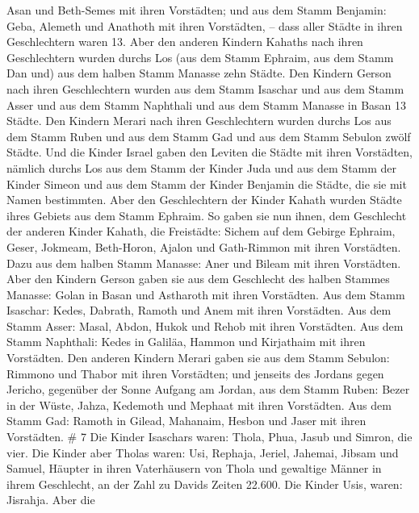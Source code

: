  Asan und Beth-Semes mit ihren Vorstädten; 
und aus dem Stamm Benjamin: Geba, Alemeth und Anathoth mit ihren
Vorstädten, -- dass aller Städte in ihren Geschlechtern waren 13.
 Aber den anderen Kindern Kahaths nach ihren Geschlechtern
wurden durchs Los (aus dem Stamm Ephraim, aus dem Stamm Dan und) aus dem
halben Stamm Manasse zehn Städte.  Den Kindern Gerson nach
ihren Geschlechtern wurden aus dem Stamm Isaschar und aus dem Stamm
Asser und aus dem Stamm Naphthali und aus dem Stamm Manasse in Basan 13
Städte.  Den Kindern Merari nach ihren Geschlechtern wurden
durchs Los aus dem Stamm Ruben und aus dem Stamm Gad und aus dem Stamm
Sebulon zwölf Städte.  Und die Kinder Israel gaben den
Leviten die Städte mit ihren Vorstädten,  nämlich durchs
Los aus dem Stamm der Kinder Juda und aus dem Stamm der Kinder Simeon
und aus dem Stamm der Kinder Benjamin die Städte, die sie mit Namen
bestimmten.  Aber den Geschlechtern der Kinder Kahath
wurden Städte ihres Gebiets aus dem Stamm Ephraim.  So
gaben sie nun ihnen, dem Geschlecht der anderen Kinder Kahath, die
Freistädte: Sichem auf dem Gebirge Ephraim, Geser, 
Jokmeam, Beth-Horon,  Ajalon und Gath-Rimmon mit ihren
Vorstädten.  Dazu aus dem halben Stamm Manasse: Aner und
Bileam mit ihren Vorstädten.  Aber den Kindern Gerson gaben
sie aus dem Geschlecht des halben Stammes Manasse: Golan in Basan und
Astharoth mit ihren Vorstädten.  Aus dem Stamm Isaschar:
Kedes, Dabrath,  Ramoth und Anem mit ihren Vorstädten.
 Aus dem Stamm Asser: Masal, Abdon,  Hukok und
Rehob mit ihren Vorstädten.  Aus dem Stamm Naphthali: Kedes
in Galiläa, Hammon und Kirjathaim mit ihren Vorstädten. 
Den anderen Kindern Merari gaben sie aus dem Stamm Sebulon: Rimmono und
Thabor mit ihren Vorstädten;  und jenseits des Jordans
gegen Jericho, gegenüber der Sonne Aufgang am Jordan, aus dem Stamm
Ruben: Bezer in der Wüste, Jahza,  Kedemoth und Mephaat mit
ihren Vorstädten.  Aus dem Stamm Gad: Ramoth in Gilead,
Mahanaim,  Hesbon und Jaser mit ihren Vorstädten. \# 7
 Die Kinder Isaschars waren: Thola, Phua, Jasub und Simron,
die vier.  Die Kinder aber Tholas waren: Usi, Rephaja,
Jeriel, Jahemai, Jibsam und Samuel, Häupter in ihren Vaterhäusern von
Thola und gewaltige Männer in ihrem Geschlecht, an der Zahl zu Davids
Zeiten 22.600.  Die Kinder Usis, waren: Jisrahja. Aber die
